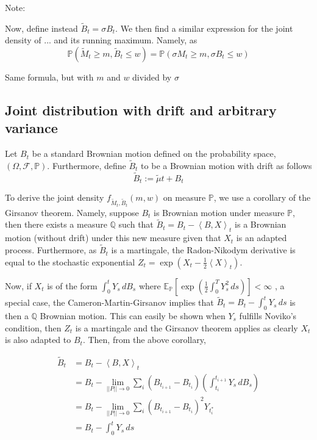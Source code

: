 \documentclass[../Thesis.tex]{subfiles}
\begin{document}
Note:

Now, define instead $\tilde{B}_t = \sigma B_t$. We then find a similar expression for the joint density of ... and its running maximum. Namely, as
$$\mathbb{P}\left(\tilde{M}_t \geq m, \tilde{B}_t \leq w\right) = \mathbb{P}\left(\sigma M_t \geq m, \sigma B_t \leq w\right)$$

Same formula, but with $m$ and $w$ divided by $\sigma$



\subsection{Joint distribution with drift and arbitrary variance}
Let $B_t$ be a standard Brownian motion defined on the probability space, $(\Omega, \mathcal{F}, \mathbb{P})$. Furthermore, define $\tilde{B}_t$ to be a Brownian motion with drift as follows
$$\tilde{B}_t := \tilde{\mu} t + B_t$$

To derive the joint density $f_{\tilde{M}_t, \tilde{B}_t}(m,w)$ on measure $\mathbb{P}$, we use a corollary of the Girsanov theorem. Namely, suppose $B_t$ is Brownian motion under measure $\mathbb{P}$, then there exists a measure $\mathbb{Q}$ such that $\tilde{B}_t = B_t - \left<B,X\right>_t$ is a Brownian motion (without drift) under this new measure given that $X_t$ is an adapted process. Furthermore, as $\tilde{B}_t$ is a martingale, the Radon-Nikodym derivative is equal to the stochastic exponential $Z_t = \exp\left({X_t - \frac{1}{2}\left<X\right>_t}\right)$.

Now, if $X_t$ is of the form $\int_0^t Y_s \, dB_s$ where
$\mathbb{E}_{\mathbb{P}} \left[ \exp{\left(  \frac{1}{2} \int_0^T Y_s^2 \, ds \right)} \right] < \infty$
, a special case, the Cameron-Martin-Girsanov implies that $\tilde{B}_t = B_t - \int_0^t Y_s \, ds$ is then a $\mathbb{Q}$ Brownian motion. This can easily be shown when $Y_s$ fulfills Noviko's condition, then $Z_t$ is a martingale and the Girsanov theorem applies as clearly $X_t$ is also adapted to $B_t$. Then, from the above corollary,

\begin{align*}
    \tilde{B}_t & = B_t - \left< B, X\right>_t                                                                                      \\
                & = B_t - \lim_{||P|| \to 0} \sum_i \left(B_{t_{i+1}} - B_{t_i}\right)\left(\int_{t_i}^{t_{i+1}} Y_s \, dB_s\right) \\
                & = B_t - \lim_{||P|| \to 0} \sum_i \left(B_{t_{i+1}} - B_{t_i}\right)^2Y_{t_i^*}                                   \\
                & = B_t - \int_0^t Y_s\,ds
\end{align*}
\end{document}
